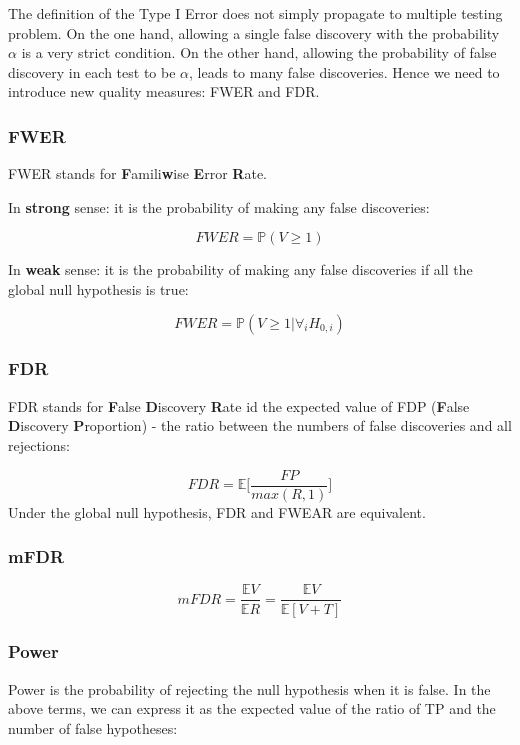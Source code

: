 \documentclass[
]{article}
\begin{document}
The definition of the Type I Error does not simply propagate to multiple
testing problem. On the one hand, allowing a single false discovery with
the probability \(\alpha\) is a very strict condition. On the other
hand, allowing the probability of false discovery in each test to be
\(\alpha\), leads to many false discoveries. Hence we need to introduce
new quality measures: FWER and FDR.

\hypertarget{fwer}{%
\subsubsection{FWER}\label{fwer}}

FWER stands for \textbf{F}amili\textbf{w}ise \textbf{E}rror
\textbf{R}ate.

In \textbf{strong} sense: it is the probability of making any false
discoveries:

\[FWER = \mathbb{P}(V \geq 1)\]

In \textbf{weak} sense: it is the probability of making any false
discoveries if all the global null hypothesis is true:

\[FWER = \mathbb{P}(V \geq 1 |  \forall_i H_{0, i})\]

\hypertarget{fdr}{%
\subsubsection{FDR}\label{fdr}}

FDR stands for \textbf{F}alse \textbf{D}iscovery \textbf{R}ate id the
expected value of FDP (\textbf{F}alse \textbf{D}iscovery
\textbf{P}roportion) - the ratio between the numbers of false
discoveries and all rejections:

\[FDR = \mathbb{E}\Bigg[ \frac{FP}{ max(R, 1)}\Bigg]\] Under the global
null hypothesis, FDR and FWEAR are equivalent.

\hypertarget{mfdr}{%
\subsubsection{mFDR}\label{mfdr}}

\[mFDR = \frac {\mathbb E V } {\mathbb E R} = \frac {\mathbb E V} {\mathbb E [V + T]} \]

\hypertarget{power}{%
\subsubsection{Power}\label{power}}

Power is the probability of rejecting the null hypothesis when it is
false. In the above terms, we can express it as the expected value of
the ratio of TP and the number of false hypotheses:
\end{document}
